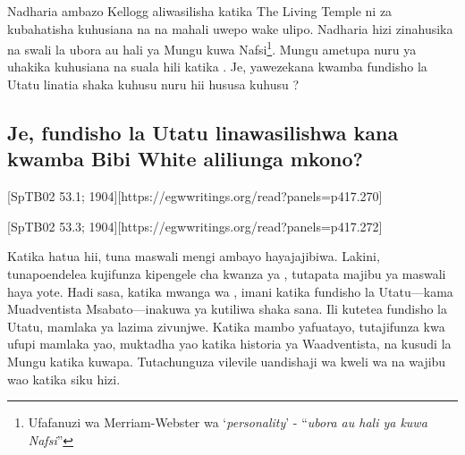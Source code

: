 Nadharia ambazo Kellogg aliwasilisha katika The Living Temple ni za kubahatisha kuhusiana na  na mahali uwepo wake ulipo. Nadharia hizi zinahusika na swali la ubora au hali ya Mungu kuwa Nafsi\footnote{Ufafanuzi wa Merriam-Webster wa ‘\textit{personality}’ - “\textit{ubora au hali ya kuwa Nafsi}”}. Mungu ametupa nuru ya uhakika kuhusiana na suala hili katika . Je, yawezekana kwamba fundisho la Utatu linatia shaka kuhusu nuru hii hususa kuhusu ?


\subsection*{Je, fundisho la Utatu linawasilishwa kana kwamba Bibi White aliliunga mkono?}


[SpTB02 53.1; 1904][https://egwwritings.org/read?panels=p417.270]


[SpTB02 53.3; 1904][https://egwwritings.org/read?panels=p417.272]


Katika hatua hii, tuna maswali mengi ambayo hayajajibiwa. Lakini, tunapoendelea kujifunza kipengele cha kwanza ya , tutapata majibu ya maswali haya yote. Hadi sasa, katika mwanga wa , imani katika fundisho la Utatu—kama Muadventista Msabato—inakuwa ya kutiliwa shaka sana. Ili kutetea fundisho la Utatu, mamlaka ya  lazima zivunjwe. Katika mambo yafuatayo, tutajifunza kwa ufupi mamlaka yao, muktadha yao katika historia ya Waadventista, na kusudi la Mungu katika kuwapa. Tutachunguza vilevile uandishaji wa kweli wa  na wajibu wao katika siku hizi.



